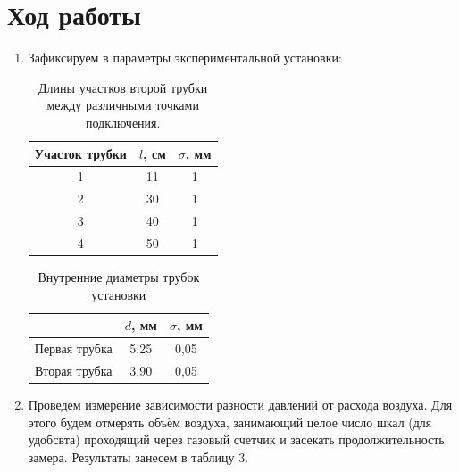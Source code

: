 \documentclass[11pt,a4paper]{article}
\begin{document}
\section{\textbf{Ход работы}}
\begin{enumerate}
\item Зафиксируем в параметры экспериментальной установки:
\begin{table}[h!]
  \centering
  \begin{tabular}{|c|c|c|}
  \hline
  Участок трубки & $l$, см & $\sigma$, мм \\ \hline
  1                 & 11      & 1            \\ \hline
  2                 & 30      & 1            \\ \hline
  3                 & 40      & 1            \\ \hline
  4                 & 50      & 1            \\ \hline
  \end{tabular}
  \caption{Длины участков второй трубки между различными точками подключения.}
  \label{tab:second_tube_parametrs}
\end{table}

\begin{table}[h!]
\centering
\begin{tabular}{|c|c|c|}
\hline
              & $d$, мм & $\sigma$, мм \\ \hline
Первая трубка & 5,25    & 0,05         \\ \hline
Вторая трубка & 3,90    & 0,05         \\ \hline
\end{tabular}
\caption{Внутренние диаметры трубок установки}
\label{tab:facilitys_tube_diam}
\end{table}

\item Проведем измерение зависимости разности давлений от расхода воздуха. 
Для этого будем отмерять объём воздуха, занимающий целое число шкал (для удобсвта) проходящий через газовый счетчик и засекать продолжительность замера. 
Результаты занесем в таблицу 3.
 

\end{enumerate}
\end{document}
